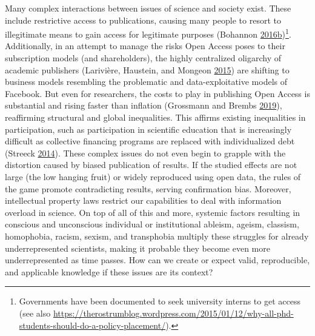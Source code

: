 \documentclass[a5paper]{book}
\let\rmarkdownfootnote\footnote%
\def\footnote{\protect\rmarkdownfootnote}
\begin{document}
Many complex interactions between issues of science and society exist.
These include restrictive access to publications, causing many people to
resort to illegitimate means to gain access for legitimate purposes
(Bohannon
\protect\hyperlink{ref-doi:10.1126ux2fscience.352.6285.508}{2016}\protect\hyperlink{ref-doi:10.1126ux2fscience.352.6285.508}{b})\footnote{Governments
  have been documented to seek university interns to get access (see
  also
  \url{https://therostrumblog.wordpress.com/2015/01/12/why-all-phd-students-should-do-a-policy-placement/}).}.
Additionally, in an attempt to manage the risks Open Access poses to
their subscription models (and shareholders), the highly centralized
oligarchy of academic publishers (Larivière, Haustein, and Mongeon
\protect\hyperlink{ref-doi:10.1371ux2fjournal.pone.0127502}{2015}) are
shifting to business models resembling the problematic and
data-exploitative models of Facebook. But even for researchers, the
costs to play in publishing Open Access is substantial and rising faster
than inflation (Grossmann and Brembs
\protect\hyperlink{ref-doi:10.7287ux2fpeerj.preprints.27809v1}{2019}),
reaffirming structural and global inequalities. This affirms existing
inequalities in participation, such as participation in scientific
education that is increasingly difficult as collective financing
programs are replaced with individualized debt (Streeck
\protect\hyperlink{ref-isbn:9781781686195}{2014}). These complex issues
do not even begin to grapple with the distortion caused by biased
publication of results. If the studied effects are not large (the low
hanging fruit) or widely reproduced using open data, the rules of the
game promote contradicting results, serving confirmation bias. Moreover,
intellectual property laws restrict our capabilities to deal with
information overload in science. On top of all of this and more,
systemic factors resulting in conscious and unconscious individual or
institutional ableism, ageism, classism, homophobia, racism, sexism, and
transphobia multiply these struggles for already underrepresented
scientists, making it probable they become even more underrepresented as
time passes. How can we create or expect valid, reproducible, and
applicable knowledge if these issues are its context?
\end{document}
